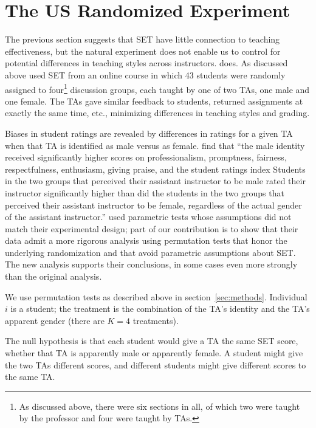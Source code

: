 \documentclass[12pt]{article}
\begin{document}
\section{The US Randomized Experiment} \label{sec:US-results}

The previous section suggests that SET have little
connection to teaching effectiveness, but the natural experiment 
does not enable us to control for potential differences in teaching 
styles across instructors. 
\citet{MacNell2014} does.
As discussed above used SET from an online course in which 
43 students were randomly assigned to four\footnote{%
   As discussed above, there were six sections in all, of which two 
   were taught by the professor and four
   were taught by TAs.
} 
discussion groups, each taught by one of two TAs, one male and one female. 
The TAs gave similar feedback to students, returned assignments at exactly the same time, etc., 
minimizing differences in teaching styles and grading.

Biases in student ratings are revealed by differences in ratings for a given TA when that 
TA is identified as male versus as female.
\citet{MacNell2014} find that ``the male identity received significantly higher scores on professionalism, promptness, fairness, respectfulness, enthusiasm, giving praise, and the
student ratings index \textellipsis Students in the two groups that perceived their assistant
instructor to be male rated their instructor significantly higher than did the students in the
two groups that perceived their assistant instructor to be female, regardless of the actual gender
of the assistant instructor.'' 
\citet{MacNell2014} used parametric tests whose assumptions did not match their experimental
design; part of our contribution is to show that their data admit a more rigorous analysis
using permutation tests that honor the underlying randomization and that avoid parametric
assumptions about SET. 
The new analysis supports their conclusions, in some cases even more strongly than the original
analysis.

We use permutation tests as described above in section~\ref{sec:methods}.
Individual $i$ is a student; the treatment is the combination of the TA's identity and the TA's
apparent gender (there are $K=4$ treatments).

The null hypothesis is that each student would give a TA the same SET score,
whether that TA is apparently male or apparently female.
A student might give the two TAs different scores,
and different students might give different scores to the same TA. 
\end{document}
